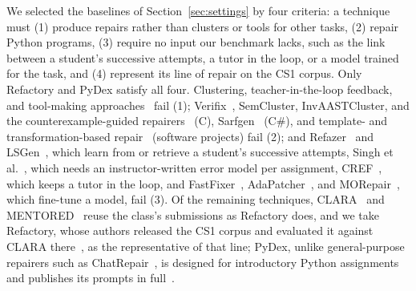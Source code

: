 \documentclass[acmsmall,screen,review,anonymous,nonacm]{acmart}
\begin{document}
We selected the baselines of Section~\ref{sec:settings} by four criteria: a technique must (1) produce repairs rather than clusters or tools for other tasks, (2) repair Python programs, (3) require no input our benchmark lacks, such as the link between a student's successive attempts, a tutor in the loop, or a model trained for the task, and (4) represent its line of repair on the CS1 corpus. Only Refactory and PyDex satisfy all four. Clustering, teacher-in-the-loop feedback, and tool-making approaches~\cite{glassman2015overcode,perry2019semcluster,orvalho2025invaastcluster,head2017writing,cai2024large,yuan2024craft,wang2024trove,stengel2024regal} fail (1); Verifix~\cite{ahmed2022verifix}, SemCluster, InvAASTCluster, and the counterexample-guided repairers~\cite{orvalho2025counterexample,orvalho2025mentor} (C), Sarfgen~\cite{wang2018search} (C\#), and template- and transformation-based repair~\cite{kim2013automatic,liu2019tbar,reyes2026agentic} (software projects) fail (2); and Refazer~\cite{rolim2017learning} and LSGen~\cite{dai2026learner}, which learn from or retrieve a student's successive attempts, Singh et al.~\cite{singh2013automated}, which needs an instructor-written error model per assignment, CREF~\cite{yang2024cref}, which keeps a tutor in the loop, and FastFixer~\cite{liu2024fastfixer}, AdaPatcher~\cite{dai2025less}, and MORepair~\cite{yang2026morepair}, which fine-tune a model, fail (3). Of the remaining techniques, CLARA~\cite{gulwani2018automated} and MENTORED~\cite{choi2025automated} reuse the class's submissions as Refactory does, and we take Refactory, whose authors released the CS1 corpus and evaluated it against CLARA there~\cite{hu2019re}, as the representative of that line; PyDex, unlike general-purpose repairers such as ChatRepair~\cite{xia2024automated}, is designed for introductory Python assignments and publishes its prompts in full~\cite{zhang2024pydex}.
\end{document}
